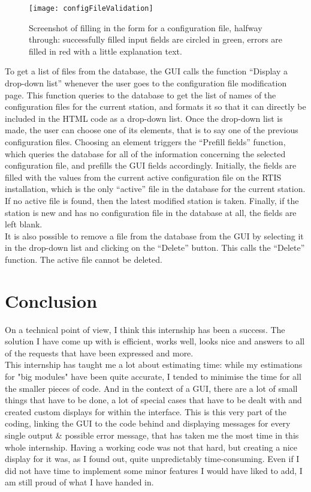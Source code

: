 \documentclass{themeensg}
\begin{document}
\begin{figure}[ht]
	\centering
	\texttt{[image: configFileValidation]}
	\caption{Screenshot of filling in the form for a configuration file, halfway through: successfully filled input fields are circled in green, errors are filled in red with a little explanation text.}
\end{figure}

To get a list of files from the database, the GUI calls the function “Display a drop-down list” whenever the user goes to the configuration file modification page. This function queries to the database to get the list of names of the configuration files for the current station, and formats it so that it can directly be included in the HTML code as a drop-down list. Once the drop-down list is made, the user can choose one of its elements, that is to say one of the previous configuration files. Choosing an element triggers the “Prefill fields” function, which queries the database for all of the information concerning the selected configuration file, and prefills the GUI fields accordingly. Initially, the fields are filled with the values from the current active configuration file on the RTIS installation, which is the only “active” file in the database for the current station. If no active file is found, then the latest modified station is taken. Finally, if the station is new and has no configuration file in the database at all, the fields are left blank.\\
It is also possible to remove a file from the database from the GUI by selecting it in the drop-down list and clicking on the “Delete” button. This calls the “Delete” function. The active file cannot be deleted.

\newevenpage
\chapter*{Conclusion}
  
	On a technical point of view, I think this internship has been a success. The solution I have come up with is efficient, works well, looks nice and answers to all of the requests that have been expressed and more.\\
	This internship has taught me a lot about estimating time: while my estimations for "big modules" have been quite accurate, I tended to minimise the time for all the smaller pieces of code. And in the context of a GUI, there are a lot of small things that have to be done, a lot of special cases that have to be dealt with and created custom displays for within the interface. This is this very part of the coding, linking the GUI to the code behind and displaying messages for every single output \& possible error message, that has taken me the most time in this whole internship. Having a working code was not that hard, but creating a nice display for it was, as I found out, quite unpredictably time-consuming. Even if I did not have time to implement some minor features I would have liked to add, I am still proud of what I have handed in.\\
	
\end{document}
